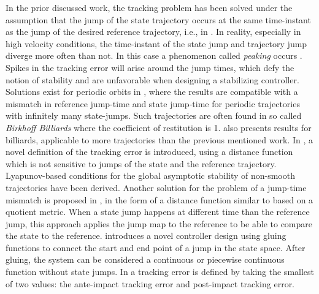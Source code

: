 \documentclass[../DC2017114Bouma.tex]{subfiles}
\begin{document}
In the prior discussed work, the tracking problem has been solved under the assumption that the jump of the state trajectory occurs at the same time-instant as the jump of the desired reference trajectory, i.e., in \cite{Naldi2013,Sanfelice2014,Posa2016}. In reality, especially in high velocity conditions, the time-instant of the state jump and trajectory jump diverge more often than not. In this case a phenomenon called \textit{peaking} occurs \cite{Biemond2013}. Spikes in the tracking error will arise around the jump times, which defy the notion of stability and are unfavorable when designing a stabilizing controller. Solutions exist for periodic orbits in \cite{Menini2001,Galeani2008}, where the results are compatible with a mismatch in reference jump-time and state jump-time for periodic trajectories with infinitely many state-jumps. Such trajectories are often found in so called \textit{Birkhoff Billiards} where the coefficient of restitution is 1. \cite{Forni2013} also presents results for billiards, applicable to more trajectories than the previous mentioned work. In \cite{Biemond2013,Biemond2016}, a novel definition of the tracking error is introduced, using a distance function which is not sensitive to jumps of the state and the reference trajectory. Lyapunov-based conditions for the global asymptotic stability of non-smooth trajectories have been derived. Another solution for the problem of a jump-time mismatch is proposed in \cite{Baumann2018}, in the form of a distance function similar to \cite{Biemond2013,Biemond2016} based on a quotient metric. When a state jump happens at different time than the reference jump, this approach applies the jump map to the reference to be able to compare the state to the reference. \cite{Kim2016} introduces a novel controller design using gluing functions to connect the start and end point of a jump in the state space. After gluing, the system can be considered a continuous or piecewise continuous function without state jumps. In \cite{Yang2017} a tracking error is defined by taking the smallest of two values: the ante-impact tracking error and post-impact tracking error.
\end{document}
